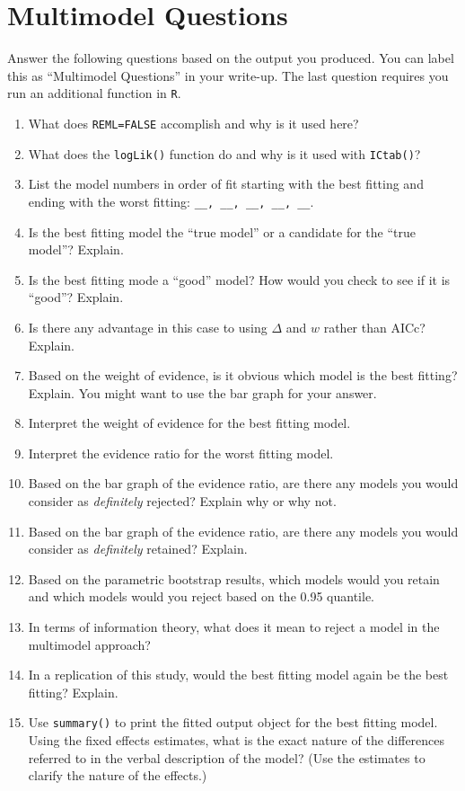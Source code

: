 \documentclass[]{article}
\begin{document}
\section*{Multimodel Questions}

\noindent Answer the following questions based on the output you produced. You can label this as ``Multimodel Questions'' in your write-up. The last question requires you run an additional function in \texttt{R}.

\begin{enumerate}
\item What does \texttt{REML=FALSE} accomplish and why is it used here?
\item What does the \texttt{logLik()} function do and why is it used with \texttt{ICtab()}?
\item List the model numbers in order of fit starting with the best fitting and ending with the worst fitting: \verb|__, __, __, __, __|.
\item Is the best fitting model the ``true model'' or a candidate for the ``true model''? Explain.
\item Is the best fitting mode a ``good'' model? How would you check to see if it is ``good''? Explain.
\item Is there any advantage in this case to using $\Delta$ and $w$ rather than AICc? Explain.
\item Based on the weight of evidence, is it obvious which model is the best fitting? Explain. You might want to use the bar graph for your answer.
\item Interpret the weight of evidence for the best fitting model.
\item Interpret the evidence ratio for the worst fitting model.
\item Based on the bar graph of the evidence ratio, are there any models you would consider as \emph{definitely} rejected? Explain why or why not.
\item Based on the bar graph of the evidence ratio, are there any models you would consider as \emph{definitely} retained? Explain.
\item Based on the parametric bootstrap results, which models would you retain and which models would you reject based on the 0.95 quantile.
\item In terms of information theory, what does it mean to reject a model in the multimodel approach?
\item In a replication of this study, would the best fitting model again be the best fitting? Explain.
\item Use \texttt{summary()} to print the fitted output object for the best fitting model. Using the fixed effects estimates, what is the exact nature of the differences referred to in the verbal description of the model? (Use the estimates to clarify the nature of the effects.)
\end{enumerate}
\end{document}
